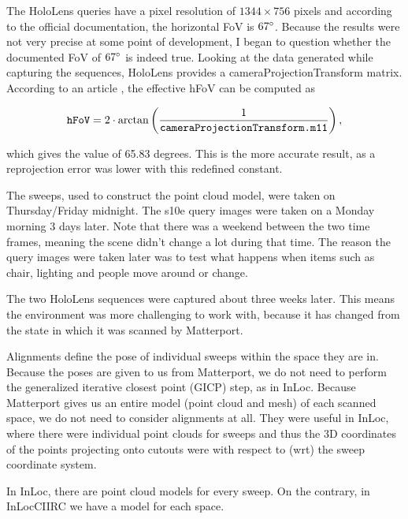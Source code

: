 \documentclass[twoside]{ctuthesis}
\theoremstyle{plain}
\theoremstyle{definition}
\theoremstyle{note}
\newcommand{\code}[1]{{\ttfamily #1%
}}
\begin{document}
The HoloLens queries have a pixel resolution of $1344 \times 756$ pixels and according to the official documentation, the horizontal FoV is $67\degree$. Because the results were not very precise at some point of development, I began to question whether the documented FoV of $67\degree$ is indeed true. Looking at the data generated while capturing the sequences, HoloLens provides a \code{cameraProjectionTransform} matrix. According to an article \cite{HoloLensFoV}, the effective hFoV can be computed as

\begin{equation}
	\text{\code{hFoV}} = 2 \cdot \arctan \left(\frac{1}{\text{\code{cameraProjectionTransform.m11}}}\right),
\end{equation}

which gives the value of 65.83 degrees. This is the more accurate result, as a reprojection error was lower with this redefined constant.

The sweeps, used to construct the point cloud model, were taken on Thursday/Friday midnight. The s10e query images were taken on a Monday morning 3 days later. Note that there was a weekend between the two time frames, meaning the scene didn't change a lot during that time. The reason the query images were taken later was to test what happens when items such as chair, lighting and people move around or change.

The two HoloLens sequences were captured about three weeks later. This means the environment was more challenging to work with, because it has changed from the state in which it was scanned by Matterport.

Alignments define the pose of individual sweeps within the space they are in. Because the poses are given to us from Matterport, we do not need to perform the generalized iterative closest point (GICP) step, as in InLoc. Because Matterport gives us an entire model (point cloud and mesh) of each scanned space, we do not need to consider alignments at all. They were useful in InLoc, where there were individual point clouds for sweeps and thus the 3D coordinates of the points projecting onto cutouts were with respect to (wrt) the sweep coordinate system.

In InLoc, there are point cloud models for every sweep. On the contrary, in InLocCIIRC we have a model for each space.
\end{document}
